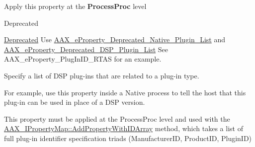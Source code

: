 \begin{Desc}
\begin{description}
\begin{DoxyItemize}
\item Apply this property at the {\bfseries Process\+Proc} level \end{DoxyItemize}
\item[{\em 
\hypertarget{a00283_a6571f4e41a5dd06e4067249228e2249ea2414ef0c66df40f47ec8f8092de3b94a}{}A\+A\+X\+\_\+e\+Property\+\_\+\+Deprecated\+\_\+\+Plugin\+\_\+\+List\label{a00283_a6571f4e41a5dd06e4067249228e2249ea2414ef0c66df40f47ec8f8092de3b94a}
}]\begin{DoxyRefDesc}{Deprecated}
\item[\hyperlink{a00386__deprecated000016}{Deprecated}]Use \hyperlink{a00283_a6571f4e41a5dd06e4067249228e2249ea3f1e690c987d601001a7cc1da8247399}{A\+A\+X\+\_\+e\+Property\+\_\+\+Deprecated\+\_\+\+Native\+\_\+\+Plugin\+\_\+\+List} and \hyperlink{a00283_a6571f4e41a5dd06e4067249228e2249eab102bc794f2770c14b1f0fe2dde6766a}{A\+A\+X\+\_\+e\+Property\+\_\+\+Deprecated\+\_\+\+D\+S\+P\+\_\+\+Plugin\+\_\+\+List} See A\+A\+X\+\_\+e\+Property\+\_\+\+Plug\+In\+I\+D\+\_\+\+R\+T\+A\+S for an example. \end{DoxyRefDesc}
\item[{\em 
\hypertarget{a00283_a6571f4e41a5dd06e4067249228e2249ea9dc35184d705e963f14f85df4d71193d}{}A\+A\+X\+\_\+e\+Property\+\_\+\+Related\+\_\+\+D\+S\+P\+\_\+\+Plugin\+\_\+\+List\label{a00283_a6571f4e41a5dd06e4067249228e2249ea9dc35184d705e963f14f85df4d71193d}
}]Specify a list of D\+S\+P plug-\/ins that are related to a plug-\/in type. \begin{DoxyItemize}
\item For example, use this property inside a Native process to tell the host that this plug-\/in can be used in place of a D\+S\+P version. \item This property must be applied at the Process\+Proc level and used with the \hyperlink{a00112_a8b7dee1eeafd7b6c0427a99386d02dd8}{A\+A\+X\+\_\+\+I\+Property\+Map\+::\+Add\+Property\+With\+I\+D\+Array} method, which takes a list of full plug-\/in identifier specification triads (Manufacturer\+I\+D, Product\+I\+D, Plugin\+I\+D) \end{DoxyItemize}

\end{description}
\end{Desc}
